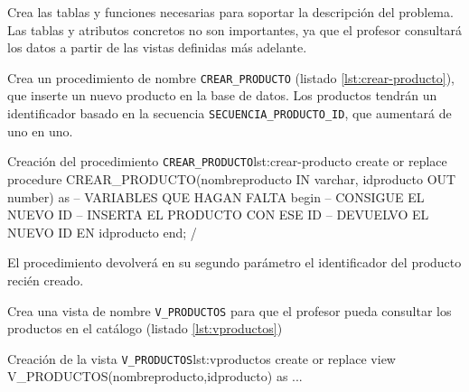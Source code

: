 \begin{homeworkProblem}
  Crea las tablas y funciones necesarias para soportar la descripción del problema. Las tablas y atributos concretos no son importantes, ya que el profesor consultará los datos a partir de las vistas definidas más adelante.
\end{homeworkProblem}

\begin{homeworkProblem}
  Crea un procedimiento de nombre \texttt{CREAR\_PRODUCTO} (listado \ref{lst:crear-producto}), que inserte un nuevo producto en la base de datos.  Los productos tendrán un identificador basado en la secuencia \texttt{SECUENCIA\_PRODUCTO\_ID}, que aumentará de uno en uno. 

  \begin{listadosql}{Creación del procedimiento \texttt{CREAR\_PRODUCTO}}{lst:crear-producto}
create or replace procedure CREAR_PRODUCTO(nombreproducto IN varchar, idproducto OUT number)
as 
  -- VARIABLES QUE HAGAN FALTA
begin
  -- CONSIGUE EL NUEVO ID 
  -- INSERTA EL PRODUCTO CON ESE ID
  -- DEVUELVO EL NUEVO ID EN idproducto
end;
/
\end{listadosql}

  El procedimiento devolverá en su segundo parámetro el identificador del producto recién creado.

  Crea una vista de nombre \texttt{V\_PRODUCTOS} para que el profesor pueda consultar los productos en el catálogo (listado \ref{lst:vproductos})
  
  \begin{listadosql}{Creación de la vista \texttt{V\_PRODUCTOS}}{lst:vproductos}
  create or replace view V_PRODUCTOS(nombreproducto,idproducto) as
  ...
  \end{listadosql}


  
\end{homeworkProblem}

